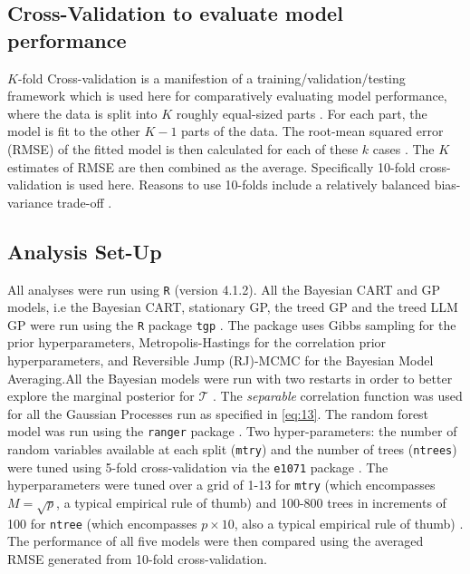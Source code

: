 \documentclass{article}\usepackage[]{graphicx}\usepackage[]{color}
\begin{document}
\subsection*{Cross-Validation to evaluate model performance}

$K$-fold Cross-validation is a manifestion of a training/validation/testing framework which is used here for comparatively evaluating model performance, where the data is split into $K$ roughly equal-sized parts \cite{hastie_friedman_tisbshirani_2017}. For each part, the model is fit to the other $K-1$ parts of the data. The root-mean squared error (RMSE) of the fitted model is then calculated for each of these $k$ cases \cite{hastie_friedman_tisbshirani_2017}. The $K$ estimates of RMSE are then combined as the average. Specifically 10-fold cross-validation is used here. Reasons to use 10-folds include a relatively balanced bias-variance trade-off \cite{hastie_friedman_tisbshirani_2017}. 


\subsection*{Analysis Set-Up}

All analyses were run using \texttt{R} (version 4.1.2). All the Bayesian CART and GP models, i.e the Bayesian CART, stationary GP, the treed GP and the treed LLM GP were run using the \texttt{R} package \texttt{tgp} \cite{gramacy_2007}. The package uses Gibbs sampling for the prior hyperparameters, Metropolis-Hastings for the correlation prior hyperparameters, and Reversible Jump (RJ)-MCMC for the Bayesian Model Averaging.All the Bayesian models were run with two restarts in order to better explore the marginal posterior for $\mathcal{T}$ \cite{chipman_1998}. The \textit{separable} correlation function was used for all the Gaussian Processes run as specified in \ref{eq:13}. The random forest model was run using the \texttt{ranger} package \cite{ranger}. Two hyper-parameters: the number of random variables available at each split (\texttt{mtry}) and the number of trees (\texttt{ntrees}) were tuned using 5-fold cross-validation via the \texttt{e1071} package \cite{e1071}. The hyperparameters were tuned over a grid of 1-13 for \texttt{mtry} (which encompasses $M = \sqrt{p}$, a typical empirical rule of thumb) and 100-800 trees in increments of 100 for \texttt{ntree} (which encompasses $p \times 10$, also a typical empirical rule of thumb) \cite{boehmke_greenwell_2020}. The performance of all five models were then compared using the averaged RMSE generated from 10-fold cross-validation. 
\end{document}
